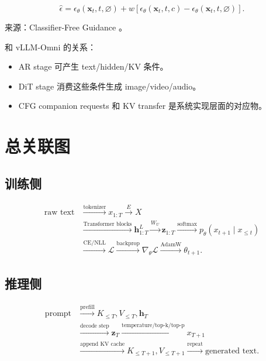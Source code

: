 \documentclass[UTF8,12pt]{ctexart}
\newcommand{\1}{\mathbf{1}}
\newcommand{\softmax}{\operatorname{softmax}}
\begin{document}
\begin{equation}
\hat{\epsilon}
=\epsilon_\theta(\bm{x}_t,t,\varnothing)
+w\left[
\epsilon_\theta(\bm{x}_t,t,c)
-\epsilon_\theta(\bm{x}_t,t,\varnothing)
\right].
\label{eq:cfg}
\end{equation}

来源：Classifier-Free Guidance \cite{hosalimans2022cfg}。

和 vLLM-Omni 的关系：

\begin{itemize}
  \item AR stage 可产生 text/hidden/KV 条件。
  \item DiT stage 消费这些条件生成 image/video/audio。
  \item CFG companion requests 和 KV transfer 是系统实现层面的对应物。
\end{itemize}

\section{总关联图}

\subsection{训练侧}

\[
\begin{aligned}
\text{raw text}
&\xrightarrow{\text{tokenizer}}
x_{1:T}
\xrightarrow{E}
X\\
&\xrightarrow{\text{Transformer blocks}}
\bm{h}_{1:T}^L
\xrightarrow{W_U}
\bm{z}_{1:T}
\xrightarrow{\softmax}
p_\theta(x_{t+1}\mid x_{\le t})\\
&\xrightarrow{\mathrm{CE/NLL}}
\mathcal{L}
\xrightarrow{\mathrm{backprop}}
\nabla_\theta\mathcal{L}
\xrightarrow{\mathrm{AdamW}}
\theta_{t+1}.
\end{aligned}
\]

\subsection{推理侧}

\[
\begin{aligned}
\text{prompt}
&\xrightarrow{\text{prefill}}
K_{\le T},V_{\le T},\bm{h}_T\\
&\xrightarrow{\text{decode step}}
\bm{z}_{T}
\xrightarrow{\text{temperature/top-k/top-p}}
x_{T+1}\\
&\xrightarrow{\text{append KV cache}}
K_{\le T+1},V_{\le T+1}
\xrightarrow{\text{repeat}}
\text{generated text}.
\end{aligned}
\]
\end{document}

